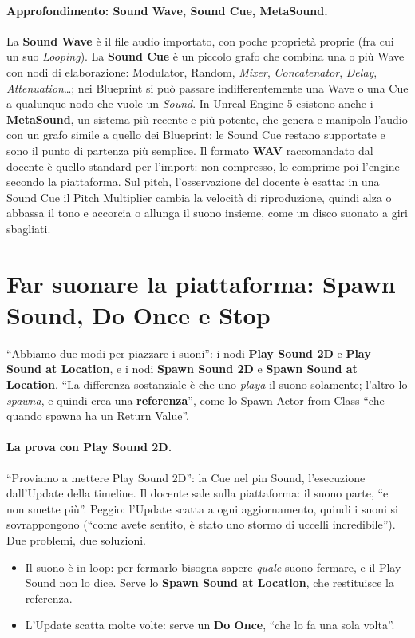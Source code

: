 \paragraph{Approfondimento: Sound Wave, Sound Cue, MetaSound.} La \textbf{Sound Wave} è
il file audio importato, con poche proprietà proprie (fra cui un suo \emph{Looping}). La
\textbf{Sound Cue} è un piccolo grafo che combina una o più Wave con nodi di
elaborazione: Modulator, Random, \emph{Mixer}, \emph{Concatenator}, \emph{Delay},
\emph{Attenuation}\ldots; nei Blueprint si può passare indifferentemente una Wave o una
Cue a qualunque nodo che vuole un \emph{Sound}. In Unreal Engine 5 esistono anche i
\textbf{MetaSound}, un sistema più recente e più potente, che genera e manipola l'audio
con un grafo simile a quello dei Blueprint; le Sound Cue restano supportate e sono il
punto di partenza più semplice. Il formato \textbf{WAV} raccomandato dal docente è quello
standard per l'import: non compresso, lo comprime poi l'engine secondo la piattaforma.
Sul pitch, l'osservazione del docente è esatta: in una Sound Cue il Pitch Multiplier
cambia la velocità di riproduzione, quindi alza o abbassa il tono e accorcia o allunga il
suono insieme, come un disco suonato a giri sbagliati.

\section{Far suonare la piattaforma: Spawn Sound, Do Once e Stop}
\label{ue6:sec:suono}

``Abbiamo due modi per piazzare i suoni'': i nodi \textbf{Play Sound 2D} e \textbf{Play
Sound at Location}, e i nodi \textbf{Spawn Sound 2D} e \textbf{Spawn Sound at Location}.
``La differenza sostanziale è che uno \emph{playa} il suono solamente; l'altro lo
\emph{spawna}, e quindi crea una \textbf{referenza}'', come lo Spawn Actor from Class
``che quando spawna ha un Return Value''.

\paragraph{La prova con Play Sound 2D.} ``Proviamo a mettere Play Sound 2D'': la Cue
nel pin Sound, l'esecuzione dall'Update della timeline. Il docente sale sulla piattaforma: il suono parte,
``e non smette più''. Peggio: l'Update scatta a ogni aggiornamento, quindi i suoni si
sovrappongono (``come avete sentito, è stato uno stormo di uccelli incredibile''). Due
problemi, due soluzioni.
\begin{itemize}
  \item Il suono è in loop: per fermarlo bisogna sapere \emph{quale} suono fermare, e il
        Play Sound non lo dice. Serve lo \textbf{Spawn Sound at Location}, che
        restituisce la referenza.
  \item L'Update scatta molte volte: serve un \textbf{Do Once}, ``che lo fa una sola
        volta''.
\end{itemize}

